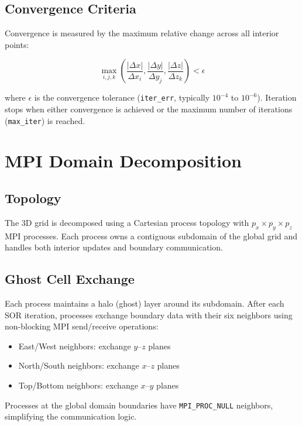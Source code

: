 \documentclass[11pt,a4paper]{report}
\begin{document}
\subsection{Convergence Criteria}

Convergence is measured by the maximum relative change across all interior points:

\begin{equation}
    \max_{i,j,k} \left( \frac{|\Delta x|}{\Delta x_i}, \frac{|\Delta y|}{\Delta y_j}, \frac{|\Delta z|}{\Delta z_k} \right) < \epsilon
\end{equation}

where $\epsilon$ is the convergence tolerance (\texttt{iter\_err}, typically $10^{-4}$ to $10^{-6}$). Iteration stops when either convergence is achieved or the maximum number of iterations (\texttt{max\_iter}) is reached.

\section{MPI Domain Decomposition}

\subsection{Topology}

The 3D grid is decomposed using a Cartesian process topology with $p_x \times p_y \times p_z$ MPI processes. Each process owns a contiguous subdomain of the global grid and handles both interior updates and boundary communication.

\subsection{Ghost Cell Exchange}

Each process maintains a halo (ghost) layer around its subdomain. After each SOR iteration, processes exchange boundary data with their six neighbors using non-blocking MPI send/receive operations:

\begin{itemize}
    \item East/West neighbors: exchange $y$--$z$ planes
    \item North/South neighbors: exchange $x$--$z$ planes
    \item Top/Bottom neighbors: exchange $x$--$y$ planes
\end{itemize}

Processes at the global domain boundaries have \texttt{MPI\_PROC\_NULL} neighbors, simplifying the communication logic.
\end{document}
